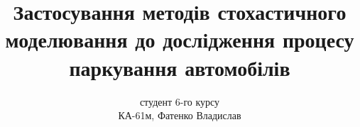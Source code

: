 \author{студент 6-го курсу\\ КА-61м, Фатенко Владислав}
\title[Стохастичне моделювання паркінгу]{Застосування методів стохастичного моделювання до дослідження процесу паркування автомобілів}
\date{}

